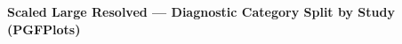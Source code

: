 \documentclass[a4paper,10pt]{article}
\begin{document}
\begin{center}
{\Large\bfseries Scaled Large Resolved — Diagnostic Category Split by Study (PGFPlots)}\\[6pt]

\end{center}
\end{document}
